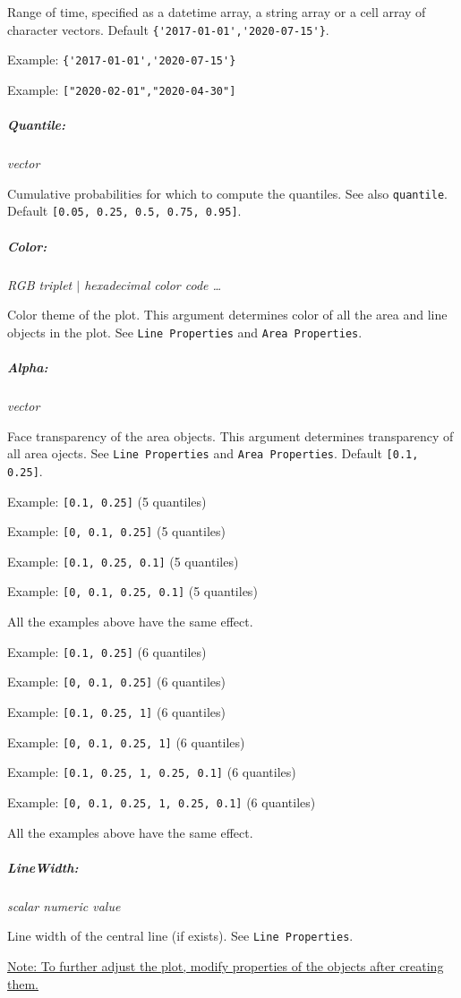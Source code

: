 \documentclass[11pt]{article}
\numberwithin{equation}{section}
\numberwithin{table}{section}
\numberwithin{figure}{section}
\begin{document}
Range of time, specified as a datetime array, a string array or a cell array of character vectors. Default \verb!{'2017-01-01','2020-07-15'}!.

Example: \verb!{'2017-01-01','2020-07-15'}!

Example: \verb!["2020-02-01","2020-04-30"]!

\subparagraph{Quantile:} \textit{vector}

Cumulative probabilities for which to compute the quantiles. See also \verb!quantile!. Default \verb![0.05, 0.25, 0.5, 0.75, 0.95]!.

\subparagraph{Color:} \textit{RGB triplet $|$ hexadecimal color code \dots}

Color theme of the plot. This argument determines color of all the area and line objects in the plot. See \verb!Line Properties! and \verb!Area Properties!.

\subparagraph{Alpha:} \textit{vector}

Face transparency of the area objects. This argument determines transparency of all area ojects. See \verb!Line Properties! and \verb!Area Properties!. Default \verb![0.1, 0.25]!.

Example: \verb![0.1, 0.25]! (5 quantiles)

Example: \verb![0, 0.1, 0.25]! (5 quantiles)

Example: \verb![0.1, 0.25, 0.1]! (5 quantiles)

Example: \verb![0, 0.1, 0.25, 0.1]! (5 quantiles)

All the examples above have the same effect.

Example: \verb![0.1, 0.25]! (6 quantiles)

Example: \verb![0, 0.1, 0.25]! (6 quantiles)

Example: \verb![0.1, 0.25, 1]! (6 quantiles)

Example: \verb![0, 0.1, 0.25, 1]! (6 quantiles)

Example: \verb![0.1, 0.25, 1, 0.25, 0.1]! (6 quantiles)

Example: \verb![0, 0.1, 0.25, 1, 0.25, 0.1]! (6 quantiles)

All the examples above have the same effect.

\subparagraph{LineWidth:} \textit{scalar numeric value}

Line width of the central line (if exists). See \verb!Line Properties!.

\underline{Note: To further adjust the plot, modify properties of the objects after creating them.}
\end{document}
